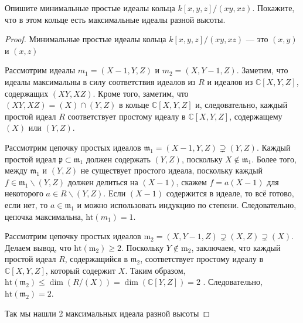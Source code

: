 \begin{prob}
Опишите минимальные простые идеалы кольца $k[x, y, z] /(x y, x z)$. Покажите, что в этом кольце есть максимальные идеалы разной высоты.
\end{prob}
\begin{proof}
Минимальные простые идеалы кольца $k[x,y,z]/(xy,xz)$ — это $(x,y)$ и $(x,z)$

Рассмотрим идеалы $m_1 = (X-1,Y,Z)$ и $m_2 = (X,Y-1,Z)$. Заметим, что идеалы максимальны в силу соответствия идеалов из $R$ и идеалов из $\mathbb{C}[X, Y, Z]$, содержащих $(X Y, X Z)$. Кроме того, заметим, что $(X Y, X Z)=(X) \cap(Y, Z)$ в кольце $\mathbb{C}[X, Y, Z]$ и, следовательно, каждый простой идеал $R$ соответствует простому идеалу в $\mathbb{C}[X, Y, Z]$, содержащему $(X)$ или $(Y, Z)$.

Рассмотрим цепочку простых идеалов $\mathfrak{m}_1=(X-1, Y, Z) \supsetneq(Y, Z)$. Каждый простой идеал $\mathfrak{p} \subset \mathfrak{m}_1$ должен содержать $(Y, Z)$, поскольку $X \notin \mathfrak{m}_1$. Более того, между $\mathfrak{m}_1$ и $(Y, Z)$ не существует простого идеала, поскольку каждый $f \in \mathfrak{m}_1 \backslash(Y, Z)$ должен делиться на $(X-1)$, скажем $f=a(X-1)$ для некоторого $a \in R \backslash(Y, Z)$. Если $(X-1)$ содержится в идеале, то всё готово, если нет, то $a \in \mathfrak{m}_1$ и можно использовать индукцию по степени. Следовательно, цепочка максимальна, $\mathrm{ht}\left(m_1\right)=1$.

Рассмотрим цепочку простых идеалов $\mathrm{m}_2=(X, Y-1, Z) \supsetneq(X, Z) \supsetneq(X)$. Делаем вывод, что $\mathrm{ht}\left(\mathrm{m}_2\right) \geqslant 2$. Поскольку $Y \notin \mathrm{m}_2$, заключаем, что каждый простой идеал $R$, содержащийся в $\mathfrak{m}_2$, соответствует простому идеалу в $\mathbb{C}[X, Y, Z ]$, который содержит $X$. Таким образом, $\mathrm{ht}\left(\mathfrak{m}_2\right) \leqslant \operatorname{dim}(R /(X))=\operatorname{dim}(\mathbb{C}[Y, Z])=2$ . Следовательно, $\mathrm{ht}\left(\mathfrak{m}_2\right)=2$.

Так мы нашли 2 максимальных идеала разной высоты
\end{proof}
\begin{comment}
https://metaphor.ethz.ch/x/2017/hs/401-3132-00L/ex/Sol9.pdf
https://math.stackexchange.com/questions/493672/proof-that-the-ideal-xy-xz-in-mathbba3-is-radical-but-not-prime
\end{comment}